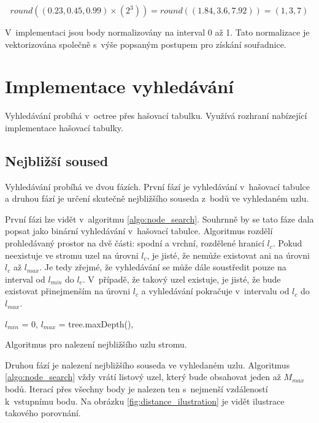 \[
round((0.23,0.45,0.99) \times (2^3)) = round((1.84, 3.6, 7.92)) = (1,3,7)
\]

V~implementaci jsou body normalizovány na interval 0 až 1. Tato normalizace je vektorizována společně s~výše popsaným postupem pro získání souřadnice. 

\section{Implementace vyhledávání}
Vyhledávání probíhá v~octree přes hašovací tabulku. Využívá rozhraní nabízející implementace hašovací tabulky.

\subsection*{Nejbližší soused}
Vyhledávání probíhá ve dvou fázích. První fází je vyhledávání v~hašovací tabulce a druhou fází je určení skutečně nejbližšího souseda z~bodů ve vyhledaném uzlu.

První fázi lze vidět v~algoritmu \ref{algo:node_search}. Souhrnně by se tato fáze dala popsat jako binární vyhledávání v~hašovací tabulce. Algoritmus rozdělí prohledávaný prostor na dvě části: spodní a vrchní, rozdělené hranicí $l_c$. Pokud neexistuje ve stromu uzel na úrovni $l_c$, je jisté, že nemůže existovat ani na úrovni $l_c$ až $l_{max}$. Je tedy zřejmé, že vyhledávání se může dále soustředit pouze na interval od $l_{min}$ do $l_c$. V~případě, že takový uzel existuje, je jisté, že bude existovat přinejmenším na úrovni $l_c$ a vyhledávání pokračuje v~intervalu od $l_c$ do $l_{max}$.

\begin{algorithm}
    \SetAlgoLined


    $l_{min}$ = 0,
    $l_{max}$ = tree.maxDepth(),


    \caption{Algoritmus pro nalezení nejbližšího uzlu stromu.}
    \label{algo:node_search}
\end{algorithm}


Druhou fází je nalezení nejbližšího souseda ve vyhledaném uzlu. Algoritmus \ref{algo:node_search} vždy vrátí listový uzel, který bude obsahovat jeden až $M_{max}$ bodů. Iterací přes všechny body je nalezen ten s~nejmenší vzdáleností k~vstupnímu bodu. Na obrázku \ref{fig:distance_ilustration} je vidět ilustrace takového porovnání.


